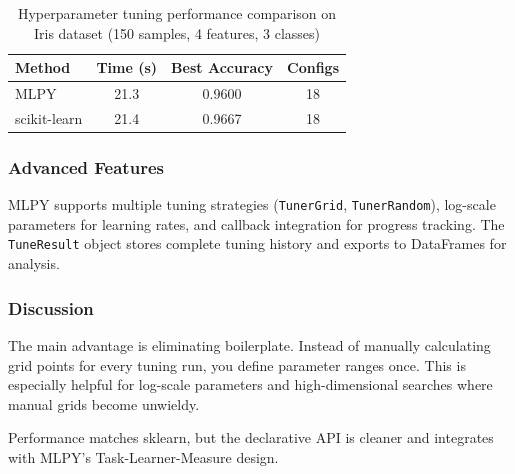 \begin{table}[ht]
\centering
\caption{Hyperparameter tuning performance comparison on Iris dataset (150 samples, 4 features, 3 classes)}
\label{tab:automl_results}
\begin{tabular}{lccc}
\toprule
\textbf{Method} & \textbf{Time (s)} & \textbf{Best Accuracy} & \textbf{Configs} \\
\midrule
MLPY & 21.3 & 0.9600 & 18 \\
scikit-learn & 21.4 & 0.9667 & 18 \\
\bottomrule
\end{tabular}
\end{table}

\subsubsection{Advanced Features}

MLPY supports multiple tuning strategies (\texttt{TunerGrid}, \texttt{TunerRandom}),
log-scale parameters for learning rates, and callback integration for progress
tracking. The \texttt{TuneResult} object stores complete tuning history and
exports to DataFrames for analysis.

\subsubsection{Discussion}

The main advantage is eliminating boilerplate. Instead of manually calculating
grid points for every tuning run, you define parameter ranges once. This is
especially helpful for log-scale parameters and high-dimensional searches where
manual grids become unwieldy.

Performance matches sklearn, but the declarative API is cleaner and integrates
with MLPY's Task-Learner-Measure design.
